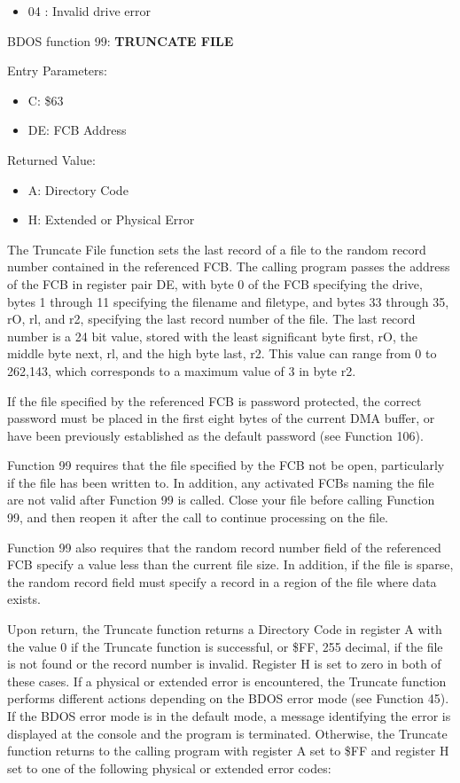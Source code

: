 \begin{itemize}
\item 04 : Invalid drive error
\end{itemize}

BDOS function 99: \textbf{TRUNCATE FILE}

Entry Parameters:
\begin{itemize}
\item[] C: \$63
\item[] DE: FCB Address
\end{itemize}

Returned Value:
\begin{itemize}
\item[] A: Directory Code
\item[] H: Extended or Physical Error
\end{itemize}

The Truncate File function sets the last record of a file to the
random record number contained in the referenced FCB. The calling
program passes the address of the FCB in register pair DE, with byte 0
of the FCB specifying the drive, bytes 1 through 11 specifying the
filename and filetype, and bytes 33 through 35, rO, rl, and r2,
specifying the last record number of the file. The last record number
is a 24 bit value, stored with the least significant byte first, rO,
the middle byte next, rl, and the high byte last, r2. This value can
range from 0 to 262,143, which corresponds to a maximum value of 3 in
byte r2.

If the file specified by the referenced FCB is password protected, the
correct password must be placed in the first eight bytes of the
current DMA buffer, or have been previously established as the default
password (see Function 106).

Function 99 requires that the file specified by the FCB not be open,
particularly if the file has been written to. In addition, any
activated FCBs naming the file are not valid after Function 99 is
called. Close your file before calling Function 99, and then reopen it
after the call to continue processing on the file.

Function 99 also requires that the random record number field of the
referenced FCB specify a value less than the current file size. In
addition, if the file is sparse, the random record field must specify
a record in a region of the file where data exists.

Upon return, the Truncate function returns a Directory Code in
register A with the value 0 if the Truncate function is successful, or
\$FF, 255 decimal, if the file is not found or the record number is
invalid. Register H is set to zero in both of these cases. If a
physical or extended error is encountered, the Truncate function
performs different actions depending on the BDOS error mode (see
Function 45). If the BDOS error mode is in the default mode, a message
identifying the error is displayed at the console and the program is
terminated. Otherwise, the Truncate function returns to the calling
program with register A set to \$FF and register H set to one of the
following physical or extended error codes:


